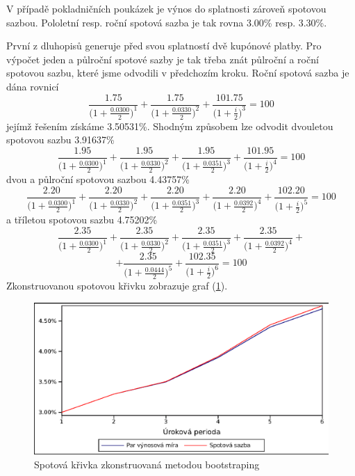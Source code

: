 \documentclass[a4paper]{book}
\begin{document}
V případě pokladničních poukázek je výnos do splatnosti zároveň spotovou sazbou. Pololetní resp. roční spotová sazba je tak rovna 3.00\% resp. 3.30\%.

První z dluhopisů generuje před svou splatností dvě kupónové platby. Pro výpočet jeden a půlroční spotové sazby je tak třeba znát půlroční a roční spotovou sazbu, které jsme odvodili v předchozím kroku. Roční spotová sazba je dána rovnicí
\begin{equation}
\frac{1.75}{\Big(1 + \frac{0.0300}{2}\Big)^1} + \frac{1.75}{\Big(1 + \frac{0.0330}{2}\Big)^2} + \frac{101.75}{\Big(1 + \frac{i}{2} \Big)^3} = 100
\end{equation}
jejímž řešením získáme 3.50531\%. Shodným způsobem lze odvodit dvouletou spotovou sazbu 3.91637\%
\begin{equation*}
\frac{1.95}{\Big(1 + \frac{0.0300}{2}\Big)^1} + \frac{1.95}{\Big(1 + \frac{0.0330}{2}\Big)^2} + \frac{1.95}{\Big(1 + \frac{0.0351}{2}\Big)^3} + \frac{101.95}{\Big(1 + \frac{i}{2} \Big)^4} = 100
\end{equation*}
dvou a půlroční spotovou sazbou 4.43757\%
\begin{equation*}
\frac{2.20}{\Big(1 + \frac{0.0300}{2}\Big)^1} + \frac{2.20}{\Big(1 + \frac{0.0330}{2}\Big)^2} + \frac{2.20}{\Big(1 + \frac{0.0351}{2}\Big)^3} + \frac{2.20}{\Big(1 + \frac{0.0392}{2} \Big)^4} + \frac{102.20}{\Big(1 + \frac{i}{2} \Big)^5} = 100
\end{equation*}
a tříletou spotovou sazbu 4.75202\%
\begin{equation*}
\frac{2.35}{\Big(1 + \frac{0.0300}{2}\Big)^1} + \frac{2.35}{\Big(1 + \frac{0.0330}{2}\Big)^2} + \frac{2.35}{\Big(1 + \frac{0.0351}{2}\Big)^3} + \frac{2.35}{\Big(1 + \frac{0.0392}{2} \Big)^4} +
\end{equation*}
\begin{equation*}
+ \frac{2.35}{\Big(1 + \frac{0.0444}{2} \Big)^5} + \frac{102.35}{\Big(1 + \frac{i}{2} \Big)^6} = 100
\end{equation*}
Zkonstruovanou spotovou křivku zobrazuje graf (\ref{spot_curve}).
\begin{figure}
  \centering
  \includegraphics[scale=0.75]{spot_curve.eps}
  \caption{Spotová křivka zkonstruovaná metodou bootstraping}
  \label{spot_curve}
\end{figure}
\end{document}
